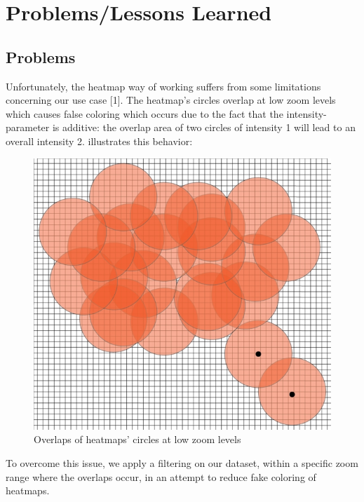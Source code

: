 \documentclass[10pt,a4paper]{article} %
\begin{document}
    

    
    

    \section{Problems/Lessons Learned}
	\subsection{Problems}

	Unfortunately, the heatmap way of working suffers from some limitations concerning our use case [1]. The heatmap's circles overlap at low zoom levels which causes false coloring which occurs due to the fact that the intensity-parameter is additive: the overlap area of two circles of intensity 1 will lead to an overall intensity 2.  illustrates this behavior:
    
    \begin{figure}[H]
    \centering
	   
       \includegraphics[scale =0.4]{pic6}
    \caption{Overlaps of heatmaps' circles at low zoom levels}
		  \label{fig:overlaps}
       
    \end{figure}
    \noindent
    To overcome this issue, we apply a filtering on our dataset, within a specific zoom range where the overlaps occur, in an attempt to reduce fake coloring of heatmaps.
\end{document}

